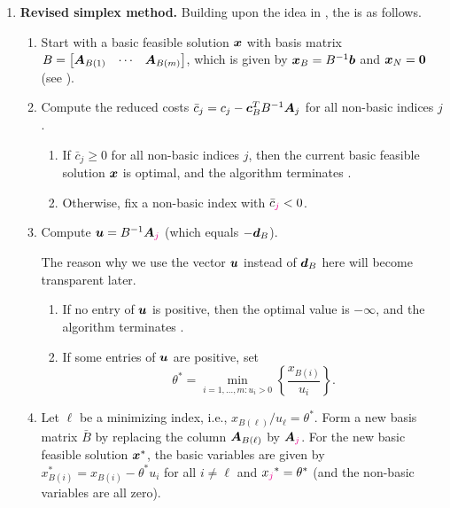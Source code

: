 \begin{enumerate}
\item\label{it:revised-simplex-algo} \textbf{Revised simplex method.} Building upon the idea in
, the  is
as follows.
\begin{enumerate}[label={(\arabic*)}]
\item Start with a basic feasible solution \(\bm{x}\) with basis matrix \(B=\begin{bmatrix}
\bm{A}_{B(1)}&\cdots&\bm{A}_{B(m)}\end{bmatrix}\), which is given by
\(\bm{x}_{B}=B^{-1}\bm{b}\) and \(\bm{x}_N=\bm{0}\) (see
). 
\item Compute the reduced costs
\(\bar{c}_j=c_j-\bm{c}_{B}^{T}B^{-1}\bm{A}_j\) for all non-basic indices
\(j\).
\begin{enumerate}
\item If \(\bar{c}_j\ge 0\) for all non-basic indices \(j\), then the current
basic feasible solution \(\bm{x}\) is optimal, and the algorithm terminates
.
\item Otherwise, fix a non-basic index  with \(\bar{c}_{\color{magenta}j}<0\).
\end{enumerate}
\item Compute \(\bm{u}=B^{-1}\bm{A}_{{\color{magenta}j}}\) (which equals
\(-\bm{d}_{B}\)).\begin{note}
The reason why we use the vector \(\bm{u}\) instead of \(\bm{d}_{B}\) here will become transparent later.
\end{note}
\begin{enumerate}
\item If no entry of \(\bm{u}\) is positive, then the optimal value is
\(-\infty\), and the algorithm terminates .
\item If some entries of \(\bm{u}\) are positive, set
\[
\theta^{*}=\min_{i=1,\dotsc,m:u_i>0}\left\{\frac{x_{B(i)}}{u_i}\right\}.
\]
\end{enumerate}
\item Let \(\ell\) be a minimizing index, i.e.,
\(x_{B(\ell)}/u_{\ell}=\theta^{*}\). Form a new basis matrix \(\bar{B}\) by
replacing the column \(\bm{A}_{B(\ell)}\) by \(\bm{A}_{\color{magenta}j}\). For the new
basic feasible solution \(\bm{x}^*\), the basic variables are given by
\(x_{B(i)}^{*}=x_{B(i)}-\theta^{*}u_i\) for all \(i\ne\ell\) and
\(x_{\color{magenta}j}^{*}=\theta^{*}\) (and the non-basic variables are all zero).


\end{enumerate}
\end{enumerate}
